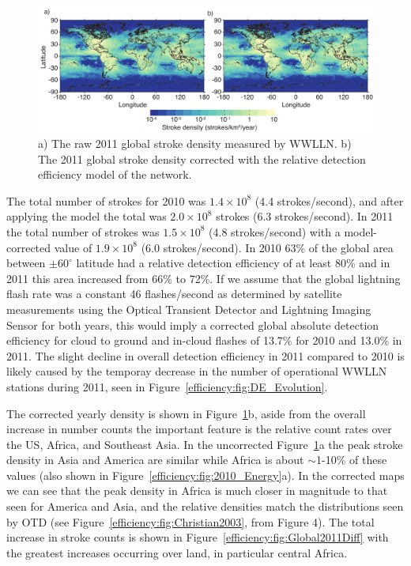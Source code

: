 \begin{figure}[ht!]
   \centering
\noindent\includegraphics[scale=0.8]{efficiency/Figures/2012RS005049-p14.pdf}
   \caption{a) The raw 2011 global stroke density measured by WWLLN.
   b) The 2011 global stroke density corrected with the relative detection efficiency model of the network.}
   \label{efficiency:fig:Global2011}
\end{figure}

The total number of strokes for 2010 was $1.4\times10^8$ (4.4 strokes/second), and after applying the model the total was $2.0\times10^8$ strokes (6.3 strokes/second).
In 2011 the total number of strokes was $1.5\times10^8$ (4.8 strokes/second) with a model-corrected value of $1.9\times10^8$ (6.0 strokes/second).
In 2010 63\% of the global area between $\pm60^\circ$ latitude had a relative detection efficiency of at least 80\% and in 2011 this area increased from 66\% to 72\%.
If we assume that the global lightning flash rate was a constant 46 flashes/second as determined by satellite measurements using the Optical Transient Detector and Lightning Imaging Sensor \citep{Cecil2011, Christian2003} for both years, this would imply a corrected global absolute detection efficiency for cloud to ground and in-cloud flashes of 13.7\% for 2010 and 13.0\% in 2011.
The slight decline in overall detection efficiency in 2011 compared to 2010 is likely caused by the temporay decrease in the number of operational WWLLN stations during 2011, seen in Figure~\ref{efficiency:fig:DE_Evolution}.

The corrected yearly density is shown in Figure~\ref{efficiency:fig:Global2011}b, aside from the overall increase in number counts the important feature is the relative count rates over the US, Africa, and Southeast Asia.
In the uncorrected Figure~\ref{efficiency:fig:Global2011}a the peak stroke density in Asia and America are similar while Africa is about $\sim$1-10\% of these values (also shown in Figure~\ref{efficiency:fig:2010_Energy}a).
In the corrected maps we can see that the peak density in Africa is much closer in magnitude to that seen for America and Asia, and the relative densities match the distributions seen by OTD (see Figure~\ref{efficiency:fig:Christian2003}, from \citet{Christian2003} Figure 4).
The total increase in stroke counts is shown in Figure~\ref{efficiency:fig:Global2011Diff} with the greatest increases occurring over land, in particular central Africa.

